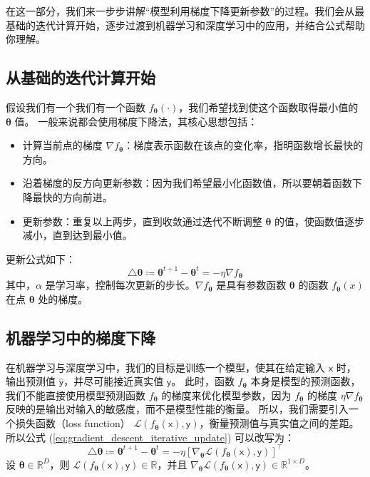 在这一部分，我们来一步步讲解“模型利用梯度下降更新参数”的过程。我们会从最基础的迭代计算开始，逐步过渡到机器学习和深度学习中的应用，并结合公式帮助你理解。

\subsection{从基础的迭代计算开始}

假设我们有一个我们有一个函数 \(f_{\bm{\theta}} \left( \cdot \right)\)，我们希望找到使这个函数取得最小值的 \(\bm{\theta}\) 值。
一般来说都会使用梯度下降法，其核心思想包括：
\begin{itemize}
    \item 计算当前点的梯度 \(\nabla f_{\bm{\theta}}\)：梯度表示函数在该点的变化率，指明函数增长最快的方向。
    \item 沿着梯度的反方向更新参数：因为我们希望最小化函数值，所以要朝着函数下降最快的方向前进。
    \item 更新参数：重复以上两步，直到收敛通过迭代不断调整 \(\bm{\theta}\) 的值，使函数值逐步减小，直到达到最小值。
\end{itemize}
更新公式如下：
\begin{equation}\label{eq:gradient_descent_iterative_update}
    \triangle \bm{\theta} \coloneq \bm{\theta}^{t+1} - \bm{\theta}^{t} = - \eta \nabla f_{\bm{\theta}}
\end{equation}
其中，\(\alpha\) 是学习率，控制每次更新的步长。\(\nabla f_{\bm{\theta}}\) 是具有参数函数 \(\bm{\theta}\) 的函数 \(f_{\bm{\theta}} \left(x\right)\) 在点 \(\bm{\theta}\) 处的梯度。

\subsection{机器学习中的梯度下降}

在机器学习与深度学习中，我们的目标是训练一个模型，使其在给定输入 \(\bm{\mathsf{x}}\) 时，输出预测值 \(\hat{\bm{\mathsf{y}}}\)，并尽可能接近真实值 \(\bm{\mathsf{y}}\)。
此时，函数 \(f_{\bm{\theta}}\) 本身是模型的预测函数，我们不能直接使用模型预测函数 \(f_{\bm{\theta}}\) 的梯度来优化模型参数，因为 \(f_{\bm{\theta}}\) 的梯度 \(\eta \nabla f_{\bm{\theta}}\) 反映的是输出对输入的敏感度，而不是模型性能的衡量。
所以，我们需要引入一个损失函数（loss function） \(\mathcal{L} \left( f_{\bm{\theta}} \left( \bm{\mathsf{x}} \right), \bm{\mathsf{y}} \right) \)，衡量预测值与真实值之间的差距。
所以公式 (\ref{eq:gradient_descent_iterative_update}) 可以改写为：
\begin{equation}\label{eq:GD-loss_iterative_update}
    \triangle \bm{\theta} \coloneq \bm{\theta}^{t+1} - \bm{\theta}^{t} = - \eta \left[ \nabla_{\bm{\theta}} \mathcal{L} \left( f_{\bm{\theta}} \left( \bm{\mathsf{x}} \right), \bm{\mathsf{y}} \right) \right]^{\top}
\end{equation}
设 \(\bm{\theta} \in \mathbb{R}^{D}\)，则 \(\mathcal{L} \left( f_{\bm{\theta}} \left( \bm{\mathsf{x}} \right), \bm{\mathsf{y}} \right) \in \mathbb{R}\)，并且 \(\nabla_{\bm{\theta}} \mathcal{L} \left( f_{\bm{\theta}} \left( \bm{\mathsf{x}} \right), \bm{\mathsf{y}} \right) \in \mathbb{R}^{1 \times D}\)。

